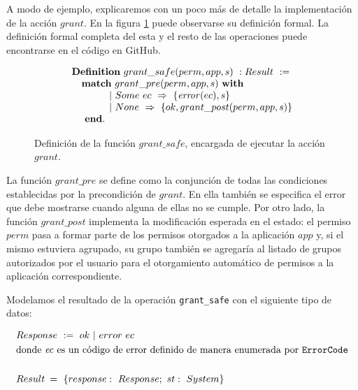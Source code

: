 A modo de ejemplo, explicaremos con un poco más de detalle la implementación de la acción $grant$.
En la figura \ref{fig:install_action} puede observarse su definición formal. La definición formal
completa del esta y el resto de las operaciones puede encontrarse en el código en
GitHub\cite{github-code}.

\begin{figure}[ht]
    \begin{displaymath}
        \begin{array}{l}
            \textbf{Definition}\ grant\_safe(perm, app, s)\ : Result\ :=                \\
            \quad \textbf{match}\ grant\_pre(perm, app, s)\ \textbf{with}               \\
            \quad \hspace{1cm} |\ Some\ ec\ \Rightarrow\ \{\ap{error}{ec},s\}           \\
            \quad \hspace{1cm} |\ None\ \Rightarrow\ \{ok, grant\_post(perm, app, s) \} \\
            \quad\ \textbf{end}.                                                        \\
        \end{array}
    \end{displaymath}
    \caption{Definición de la función $grant\_safe$, encargada de ejecutar la acción $grant$.}
    \label{fig:install_action}
\end{figure}

La función $grant\_pre$ se define como la conjunción de todas las condiciones establecidas por la
precondición de $grant$. En ella también se especifica el error que debe mostrarse cuando alguna de
ellas no se cumple. Por otro lado, la función $grant\_post$ implementa la modificación esperada en
el estado: el permiso $perm$ pasa a formar parte de los permisos otorgados a la aplicación $app$ y,
si el mismo estuviera agrupado, su grupo también se agregaría al listado de grupos autorizados por
el usuario para el otorgamiento automático de permisos a la aplicación correspondiente.

Modelamos el resultado de la operación \texttt{grant\_safe} con el siguiente tipo de datos:

\begin{align*}
     & Response\ :=\ ok\ |\ error\ ec                                                                     \\
     & \text{donde \textit{ec} es un código de error definido de manera enumerada por \texttt{ErrorCode}} \\ \\
     & Result\:=\ \{response:\ Response;\ st:\ System\}                                                   \\
\end{align*}

